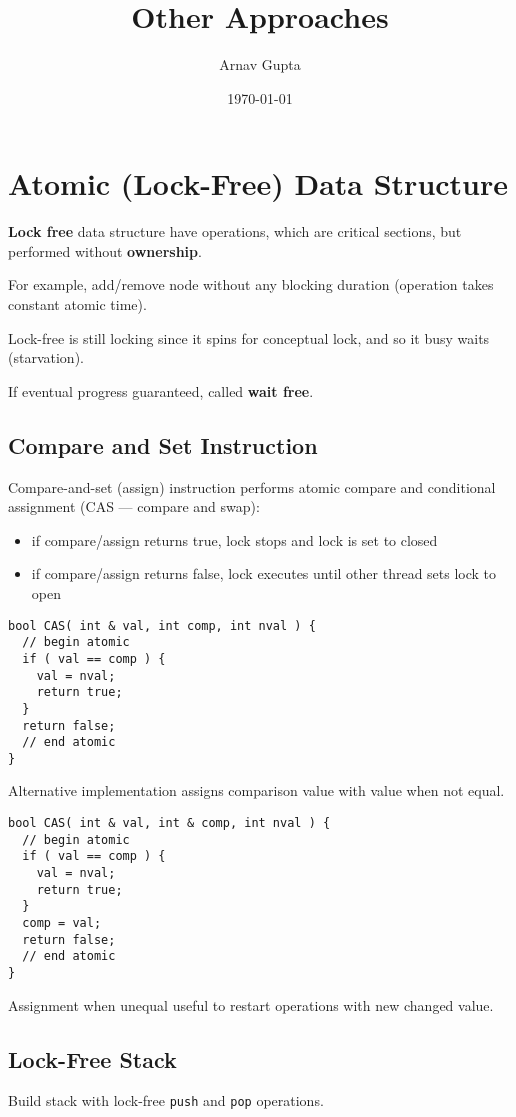 \documentclass[11pt]{article}
\author{Arnav Gupta}
\date{\today}
\title{Other Approaches}
\begin{document}
\maketitle
\tableofcontents

\section{Atomic (Lock-Free) Data Structure}
\label{sec:org3b61bd4}
\textbf{Lock free} data structure have operations, which are critical sections, but performed without
\textbf{ownership}.

For example, add/remove node without any blocking duration (operation takes constant atomic time).

Lock-free is still locking since it spins for conceptual lock, and so it busy waits (starvation).

If eventual progress guaranteed, called \textbf{wait free}.
\subsection{Compare and Set Instruction}
\label{sec:org99b2657}
Compare-and-set (assign) instruction performs atomic compare and conditional assignment (CAS ---
compare and swap):
\begin{itemize}
\item if compare/assign returns true, lock stops and lock is set to closed
\item if compare/assign returns false, lock executes until other thread sets lock to open
\end{itemize}

\begin{verbatim}
bool CAS( int & val, int comp, int nval ) {
  // begin atomic
  if ( val == comp ) {
    val = nval;
    return true;
  }
  return false;
  // end atomic
}
\end{verbatim}

Alternative implementation assigns comparison value with value when not equal.
\begin{verbatim}
bool CAS( int & val, int & comp, int nval ) {
  // begin atomic
  if ( val == comp ) {
    val = nval;
    return true;
  }
  comp = val;
  return false;
  // end atomic
}
\end{verbatim}

Assignment when unequal useful to restart operations with new changed value.
\subsection{Lock-Free Stack}
\label{sec:org6be378a}
Build stack with lock-free \texttt{push} and \texttt{pop} operations.
\end{document}
